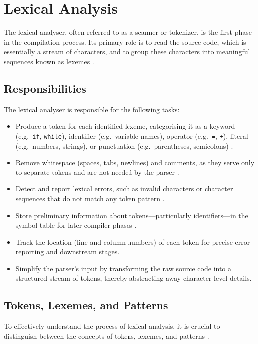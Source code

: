 
\section{Lexical Analysis}

The lexical analyser, often referred to as a scanner or tokenizer, is the first phase in the compilation process. Its primary role is to read the source code, which is essentially a stream of characters, and to group these characters into meaningful sequences known as lexemes \cite{aho2007compilers}. 

\subsection{Responsibilities}

The lexical analyser is responsible for the following tasks:
\begin{itemize}
  \item Produce a token for each identified lexeme, categorising it as a keyword (e.g.\ \texttt{if}, \texttt{while}), identifier (e.g.\ variable names), operator (e.g.\ \texttt{=}, \texttt{+}), literal (e.g.\ numbers, strings), or punctuation (e.g.\ parentheses, semicolons) \cite{aho2007compilers}.
  \item Remove whitespace (spaces, tabs, newlines) and comments, as they serve only to separate tokens and are not needed by the parser \cite{aho2007compilers}.
  \item Detect and report lexical errors, such as invalid characters or character sequences that do not match any token pattern \cite{aho2007compilers}.
  \item Store preliminary information about tokens—particularly identifiers—in the symbol table for later compiler phases \cite{aho2007compilers}.
  \item Track the location (line and column numbers) of each token for precise error reporting and downstream stages.
  \item Simplify the parser’s input by transforming the raw source code into a structured stream of tokens, thereby abstracting away character-level details.
\end{itemize}

\subsection{Tokens, Lexemes, and Patterns}

To effectively understand the process of lexical analysis, it is crucial to distinguish between the concepts of tokens, lexemes, and patterns \cite{aho2007compilers}. 


